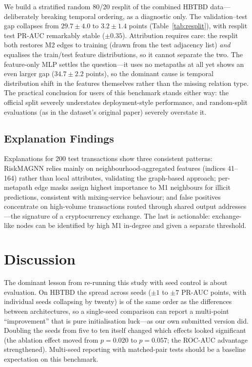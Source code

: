 \documentclass[conference]{IEEEtran}
\begin{document}
We build a stratified random 80/20 resplit of the combined HBTBD
data---deliberately breaking temporal ordering, as a diagnostic only. The
validation--test gap collapses from $29.7 \pm 4.0$ to $3.2 \pm 1.4$ points
(Table~\ref{tab:resplit}), with resplit test PR-AUC remarkably stable
($\pm 0.35$). Attribution requires care: the resplit both restores M2 edges
to training (drawn from the test adjacency list) \emph{and} equalises the
train/test feature distributions, so it cannot separate the two. The
feature-only MLP settles the question---it uses no metapaths at all yet shows
an even larger gap ($34.7 \pm 2.2$ points), so the dominant cause is temporal
distribution shift in the features themselves rather than the missing
relation type. The practical conclusion for users of this benchmark stands
either way: the official split severely understates deployment-style
performance, and random-split evaluations (as in the dataset's original
paper) severely overstate it.

\subsection{Explanation Findings}

Explanations for 200 test transactions show three consistent patterns:
RiskMAGNN relies mainly on neighbourhood-aggregated features (indices
41--164) rather than local attributes, validating the graph-based approach;
per-metapath edge masks assign highest importance to M1 neighbours for
illicit predictions, consistent with mixing-service behaviour; and false
positives concentrate on high-volume transactions routed through shared
output addresses---the signature of a cryptocurrency exchange. The last is
actionable: exchange-like nodes can be identified by high M1 in-degree and
given a separate threshold.

\section{Discussion}

The dominant lesson from re-running this study with seed control is about
evaluation. On HBTBD the spread across seeds ($\pm 1$ to $\pm 7$ PR-AUC
points, with individual seeds collapsing by twenty) is of the same order as
the differences between architectures, so a single-seed comparison can report
a multi-point ``improvement'' that is pure initialisation luck---as our own
submitted version did. Doubling the seeds from five to ten itself changed
which effects looked significant (the ablation effect moved from $p=0.020$ to
$p=0.057$; the ROC-AUC advantage strengthened). Multi-seed reporting with
matched-pair tests should be a baseline expectation on this benchmark.
\end{document}
